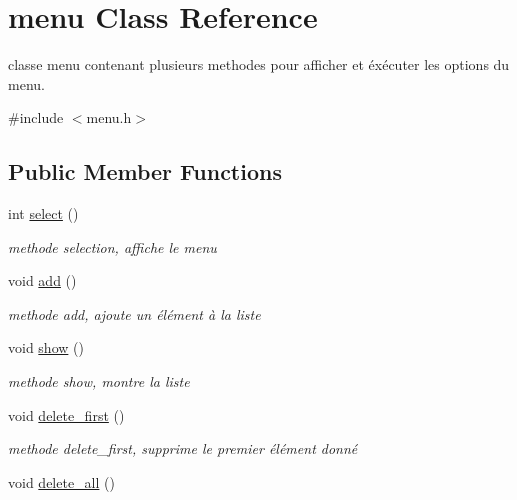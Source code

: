 \hypertarget{classmenu}{}\section{menu Class Reference}
\label{classmenu}


classe menu contenant plusieurs methodes pour afficher et éxécuter les options du menu.  




{\ttfamily \#include $<$menu.\+h$>$}

\subsection*{Public Member Functions}
\begin{DoxyCompactItemize}
\item 
int \hyperlink{classmenu_aae6b44c64a4e429c54640a5a246e94b3}{select} ()\hypertarget{classmenu_aae6b44c64a4e429c54640a5a246e94b3}{}\label{classmenu_aae6b44c64a4e429c54640a5a246e94b3}

\begin{DoxyCompactList}\small\item\em methode selection, affiche le menu \end{DoxyCompactList}\item 
void \hyperlink{classmenu_a6fd4100786d389ca943629755eff3936}{add} ()\hypertarget{classmenu_a6fd4100786d389ca943629755eff3936}{}\label{classmenu_a6fd4100786d389ca943629755eff3936}

\begin{DoxyCompactList}\small\item\em methode add, ajoute un élément à la liste \end{DoxyCompactList}\item 
void \hyperlink{classmenu_aae1769c812999eba1699adcf91481a06}{show} ()\hypertarget{classmenu_aae1769c812999eba1699adcf91481a06}{}\label{classmenu_aae1769c812999eba1699adcf91481a06}

\begin{DoxyCompactList}\small\item\em methode show, montre la liste \end{DoxyCompactList}\item 
void \hyperlink{classmenu_a5f9e06b936a77a98f8202dd05524ca42}{delete\+\_\+first} ()\hypertarget{classmenu_a5f9e06b936a77a98f8202dd05524ca42}{}\label{classmenu_a5f9e06b936a77a98f8202dd05524ca42}

\begin{DoxyCompactList}\small\item\em methode delete\+\_\+first, supprime le premier élément donné \end{DoxyCompactList}\item 
void \hyperlink{classmenu_a051fef5d59afc3462896fa74cad3c598}{delete\+\_\+all} ()\hypertarget{classmenu_a051fef5d59afc3462896fa74cad3c598}{}\label{classmenu_a051fef5d59afc3462896fa74cad3c598}


\end{DoxyCompactItemize}
